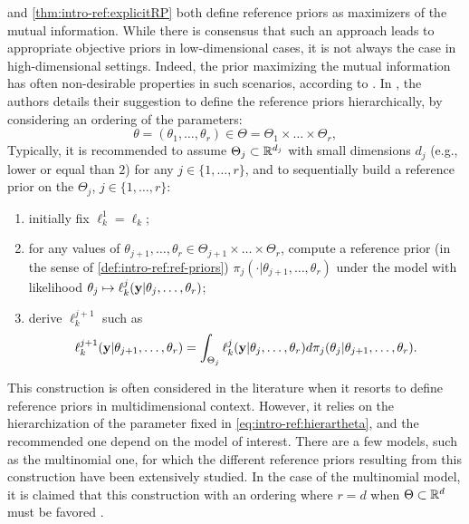  and \cref{thm:intro-ref:explicitRP}
both define reference priors as maximizers of the mutual information.
While there is consensus that such an approach leads to appropriate objective priors in low-dimensional cases, it is not always the case in high-dimensional settings.
Indeed, the prior maximizing the mutual information has often non-desirable properties in such scenarios, according to \citet{berger_overall_2015}. %
In \cite{berger_development_1992}, the authors details their suggestion to define the reference priors hierarchically, by considering an ordering of the parameters:
 \begin{equation}\label{eq:intro-ref:hierartheta}
     \theta = (\theta_1,\dots,\theta_r) \in \Theta=\Theta_1\times\dots\times\Theta_r,
 \end{equation}
Typically, it is recommended to assume $\Theta_j\subset\mathbb{R}^{d_j}$ with small dimensions $d_j$ (e.g., lower or equal than $2$) for any $j\in\{1,\dots,r\}$, and to sequentially build a reference prior on the $\Theta_j$,  $j\in\{1,\dots,r\}$:
 \begin{enumerate}
     \item initially fix $\ell_k^1=\ell_k$;
     \item for any values of $\theta_{j+1},\dots,\theta_r\in\Theta_{j+1}\times\dots\times\Theta_r$, compute a reference prior (in the sense of \cref{def:intro-ref:ref-priors}) $\pi_j(\cdot|\theta_{j+1},\dots,\theta_r)$ under the model with likelihood $\theta_j\mapsto\ell_k^j(\mathbf{y}|\theta_j,\dots,\theta_r)$;
     \item derive $\ell_k^{j+1}$ such as 
         \begin{equation}\label{eq:hier:condlikeint}
            \ell_k^{j+1}(\mathbf{y}|\theta_{j+1},\dots,\theta_r) =  \int_{\Theta_j}\ell_k^j(\mathbf{y}|\theta_j,\dots,\theta_r)d\pi_j(\theta_j|\theta_{j+1},\dots,\theta_r).
         \end{equation}
 \end{enumerate}


This construction is often considered in the literature when it resorts to define reference priors in multidimensional context. 
However, it relies on the hierarchization of the parameter fixed in \cref{eq:intro-ref:hierartheta}, and the recommended  one depend on the model of interest.
There are a few models, such as the multinomial one, for which the different reference priors resulting from this construction have been extensively studied. In the case of the multinomial model, it is claimed that this construction with an ordering where $r=d$ when $\Theta\subset\mathbb{R}^d$ must be favored  \citep{berger_ordered_1992,berger_overall_2015}.




